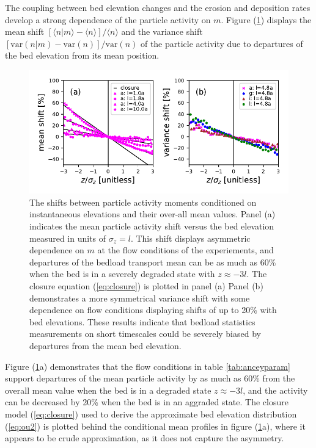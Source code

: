 The coupling between bed elevation changes and the erosion and deposition rates develop a strong dependence of the particle activity on $m$. Figure (\ref{fig:condmoms}) displays the mean shift $[\langle n |m \rangle - \langle n \rangle]/\langle n \rangle $ and the variance shift  $[\text{var}(n|m) - \text{var}(n)]/\text{var}(n)$ of the particle activity due to departures of the bed elevation from its mean position.
\begin{figure}[!htbp]
	\includegraphics[width=\linewidth,keepaspectratio]{./figures/ch3/momentsuppression.pdf}
	\caption{The shifts between particle activity moments conditioned on instantaneous elevations and their over-all mean values. Panel (a) indicates the mean particle activity shift versus the bed elevation measured in units of $\sigma_z=l$. This shift displays asymmetric dependence on $m$ at the flow conditions of the \citet{Ancey2008} experiements, and departures of the bedload transport mean can be as much as 60\% when the bed is in a severely degraded state with $z\approx -3l$. The closure equation (\ref{eq:closure}) is plotted in panel (a) Panel (b) demonstrates a more symmetrical variance shift with some dependence on flow conditions displaying shifts of up to 20\% with bed elevations. These results indicate that bedload statistics measurements on short timescales could be severely biased by departures from the mean bed elevation.}
	\label{fig:condmoms}
\end{figure}
Figure (\ref{fig:condmoms}a) demonstrates that the flow conditions in table \ref{tab:anceyparam} support departures of the mean particle activity by as much as 60\% from the overall mean value when the bed is in a degraded state $z\approx -3l$, and the activity can be decreased by 20\% when the bed is in an aggraded state.
The closure model (\ref{eq:closure}) used to derive the approximate bed elevation distribution (\ref{eq:ou2}) is plotted behind the conditional mean profiles in figure (\ref{fig:condmoms}a), where it appears to be crude approximation, as it does not capture the asymmetry.
